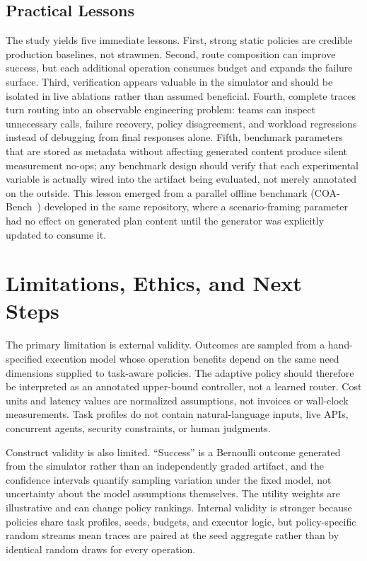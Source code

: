 \documentclass[sigconf]{acmart}
\begin{document}
\subsection{Practical Lessons}

The study yields five immediate lessons. First, strong static policies are credible production baselines, not strawmen. Second, route composition can improve success, but each additional operation consumes budget and expands the failure surface. Third, verification appears valuable in the simulator and should be isolated in live ablations rather than assumed beneficial. Fourth, complete traces turn routing into an observable engineering problem: teams can inspect unnecessary calls, failure recovery, policy disagreement, and workload regressions instead of debugging from final responses alone. Fifth, benchmark parameters that are stored as metadata without affecting generated content produce silent measurement no-ops; any benchmark design should verify that each experimental variable is actually wired into the artifact being evaluated, not merely annotated on the outside. This lesson emerged from a parallel offline benchmark (COA-Bench~\cite{kanhai2026coabench}) developed in the same repository, where a scenario-framing parameter had no effect on generated plan content until the generator was explicitly updated to consume it.

\section{Limitations, Ethics, and Next Steps}

The primary limitation is external validity. Outcomes are sampled from a hand-specified execution model whose operation benefits depend on the same need dimensions supplied to task-aware policies. The adaptive policy should therefore be interpreted as an annotated upper-bound controller, not a learned router. Cost units and latency values are normalized assumptions, not invoices or wall-clock measurements. Task profiles do not contain natural-language inputs, live APIs, concurrent agents, security constraints, or human judgments.

Construct validity is also limited. ``Success'' is a Bernoulli outcome generated from the simulator rather than an independently graded artifact, and the confidence intervals quantify sampling variation under the fixed model, not uncertainty about the model assumptions themselves. The utility weights are illustrative and can change policy rankings. Internal validity is stronger because policies share task profiles, seeds, budgets, and executor logic, but policy-specific random streams mean traces are paired at the seed aggregate rather than by identical random draws for every operation.
\end{document}
